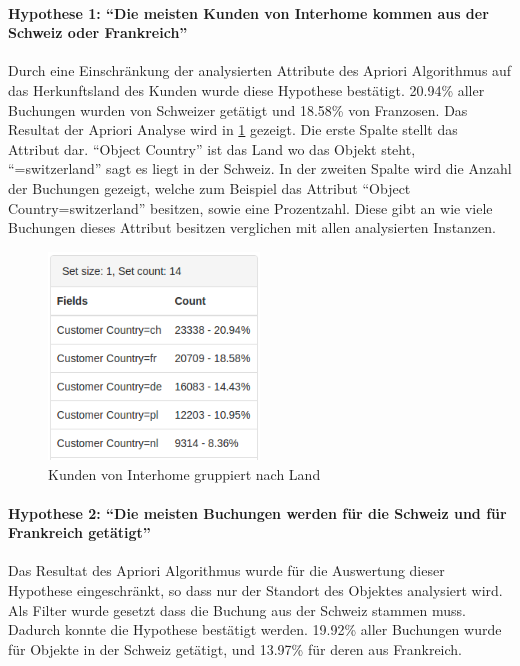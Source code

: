 \paragraph{Hypothese 1: "`Die meisten Kunden von Interhome kommen aus der Schweiz oder Frankreich"'} Durch eine Einschränkung der analysierten Attribute des Apriori Algorithmus auf das Herkunftsland des Kunden wurde diese Hypothese bestätigt. 20.94\% aller Buchungen wurden von Schweizer getätigt und 18.58\% von Franzosen. Das Resultat der Apriori Analyse wird in \cref{fig:testingfazit:testing:hypothesen:hypothese1} gezeigt. Die erste Spalte stellt das Attribut dar. "`Object Country"' ist das Land wo das Objekt steht, "`=switzerland"' sagt es liegt in der Schweiz. In der zweiten Spalte wird die Anzahl der Buchungen gezeigt, welche zum Beispiel das Attribut "`Object Country=switzerland"' besitzen, sowie eine Prozentzahl. Diese gibt an wie viele Buchungen dieses Attribut besitzen verglichen mit allen analysierten Instanzen.

\begin{figure}[H]
	\RawFloats
	\centering
	\includegraphics[width=0.5\textwidth]{images/hypothese1}
	\caption{Kunden von Interhome gruppiert nach Land}
	\label{fig:testingfazit:testing:hypothesen:hypothese1}
\end{figure}

\paragraph{Hypothese 2: "`Die meisten Buchungen werden für die Schweiz und für Frankreich getätigt"'} Das Resultat des Apriori Algorithmus wurde für die Auswertung dieser Hypothese eingeschränkt, so dass nur der Standort des Objektes analysiert wird. Als Filter wurde gesetzt dass die Buchung aus der Schweiz stammen muss. Dadurch konnte die Hypothese bestätigt werden. 19.92\% aller Buchungen wurde für Objekte in der Schweiz getätigt, und 13.97\% für deren aus Frankreich.


